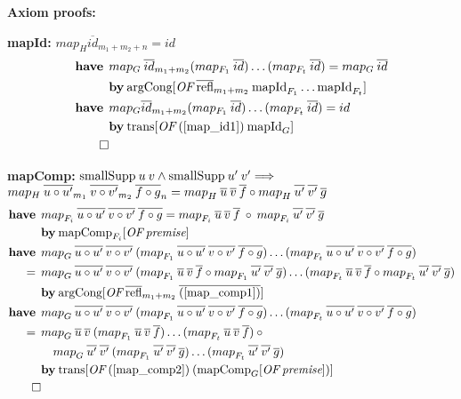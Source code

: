 \noindent
\textbf{Axiom proofs:}

\newcommand{\have}{\textbf{have}\:\:}
\newcommand{\by}{\textbf{by}\:}

\setcounter{mapId}{0}
\textbf{mapId:} $map_H \overline{id}_{m_1+m_2+n} = id$
\begin{align}
\have & map_G \: \overline{id}_{m_1+m_2} (map_{F_1} \: \overline{id}) \dots (map_{F_t} \: \overline{id}) = map_G \: \overline{id} \label{map_id1} \\
 & \by \OF{\text{argCong}}{\overline{\text{refl}}_{m_1+m_2} \: \text{mapId}_{F_1} \dots \text{mapId}_{F_t}} \nonumber \\
\have & map_G \overline{id}_{m_1+m_2} (map_{F_1} \: \overline{id}) \dots (map_{F_t} \: \overline{id}) = id \\
& \by \OF{\text{trans}}{(\ref{map_id1}) \: \text{mapId}_G} \nonumber \\
\qed \nonumber
\end{align}

\textbf{mapComp:} $\text{smallSupp} \: u \: v \wedge \text{smallSupp} \: u' \: v' \Longrightarrow$ \\
\hspace*{1.7em} $map_H \: \overline{u \circ u'}_{m_1} \: \overline{v \circ v'}_{m_2} \: \overline{f \circ g}_n = {map}_{H} \: \overline{u} \: \overline{v} \: \overline{f} \circ {map}_{H} \: \overline{u'} \: \overline{v'} \: \overline{g}$
\begin{align}
\have & \map{F_i}{u \circ u'}{v \circ v'}{f \circ g} = \map{F_i}{u}{v}{f} \: \circ \: \map{F_i}{u'}{v'}{g} \label{map_comp1} \\*
 & \by \OF{\text{mapComp}_{F_i}}{\textit{premise}} \nonumber \\
%
\have & \map{G}{u \circ u'}{v \circ v'}{}(\map{F_1}{u \circ u'}{v \circ v'}{f \circ g})\dots(\map{F_t}{u \circ u'}{v \circ v'}{f \circ g}) \nonumber \\*
= \:\: & \map{G}{u \circ u'}{v \circ v'}{}(\map{F_1}{u}{v}{f} \circ \map{F_1}{u'}{v'}{g})\dots(\map{F_t}{u}{v}{f} \circ \map{F_t}{u'}{v'}{g}) \label{map_comp2} \\*
& \by \OF{\text{argCong}}{\overline{\text{refl}}_{m_1+m_2} \: \overline{(\ref{map_comp1})}} \nonumber \\
%
\have & \map{G}{u \circ u'}{v \circ v'}{}(\map{F_1}{u \circ u'}{v \circ v'}{f \circ g})\dots(\map{F_t}{u \circ u'}{v \circ v'}{f \circ g}) \nonumber \\*
= \:\: & \map{G}{u}{v}{}(\map{F_1}{u}{v}{f})\dots(\map{F_t}{u}{v}{f}) \: \circ \nonumber \\*
& \quad \map{G}{u'}{v'}{}(\map{F_1}{u'}{v'}{g})\dots(\map{F_t}{u'}{v'}{g}) \label{map_comp3} \\*
& \by \OF{\text{trans}}{(\ref{map_comp2}) \: (\OF{\text{mapComp}_G}{\textit{premise}})} \nonumber \\*
\qed \nonumber
\end{align}

